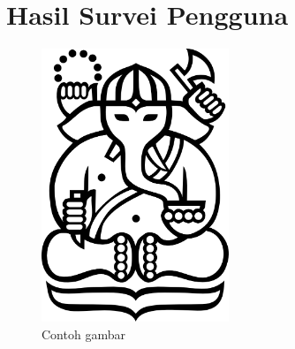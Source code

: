 \chapter{Hasil Survei Pengguna}

\begin{figure}[ht]
	\centering
	\includegraphics[width=0.5\textwidth]{resources/cover-ganesha.jpg}
	\caption{Contoh gambar}
\end{figure}